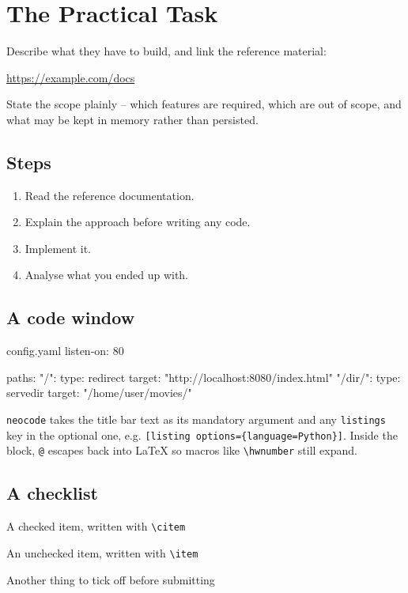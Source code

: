 \section{The Practical Task}

Describe what they have to build, and link the reference material:

\url{https://example.com/docs}

State the scope plainly -- which features are required, which are out of
scope, and what may be kept in memory rather than persisted.

\subsection{Steps}

\begin{enumerate}
    \item Read the reference documentation.
    \item Explain the approach before writing any code.
    \item Implement it.
    \item Analyse what you ended up with.
\end{enumerate}

\subsection{A code window}

\begin{neocode}[neocodetitlefont=\pixelfont]{config.yaml}
listen-on: 80

paths:
  "/":
    type: redirect
    target: "http://localhost:8080/index.html"
  "/dir/":
    type: servedir
    target: "/home/user/movies/"
\end{neocode}

\texttt{neocode} takes the title bar text as its mandatory argument and any
\texttt{listings} key in the optional one, e.g.
\texttt{[listing options=\{language=Python\}]}. Inside the block,
\texttt{@\ldots@} escapes back into \LaTeX{} so macros like \texttt{\textbackslash hwnumber}
still expand.

\subsection{A checklist}

\begin{neochecklist}
    \citem A checked item, written with \texttt{\textbackslash citem}
    \item An unchecked item, written with \texttt{\textbackslash item}
    \item Another thing to tick off before submitting
\end{neochecklist}

